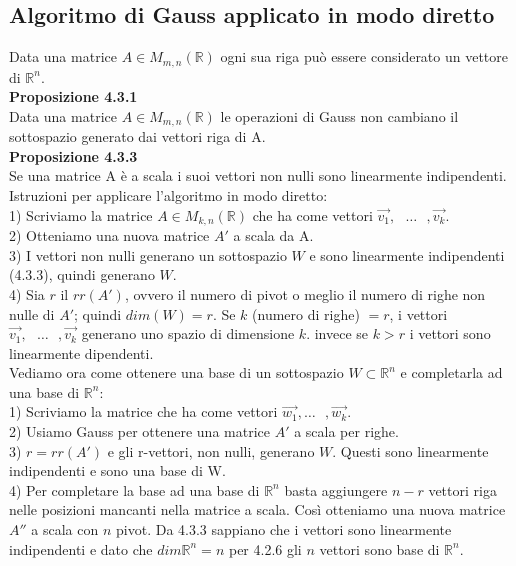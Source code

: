 \documentclass{article}
\begin{document}
\subsection{Algoritmo di Gauss applicato in modo diretto}
Data una matrice $A \in M_{m,n}(\mathbb{R})$ ogni sua riga può essere considerato un vettore di $\mathbb{R}^n$.
\textbf{\\Proposizione 4.3.1} \\Data una matrice $A \in M_{m,n}(\mathbb{R})$ le operazioni di Gauss non cambiano il sottospazio generato dai vettori riga di A.
\textbf{\\Proposizione 4.3.3} \\Se una matrice A è a scala i suoi vettori non nulli sono linearmente indipendenti.
\vspace{1em}
\\Istruzioni per applicare l'algoritmo in modo diretto:
\\1) Scriviamo la matrice $A \in M_{k,n}(\mathbb{R})$ che ha come vettori $\vec{v_1},\text{ }\dots\text{ },\vec{v_k}$.
\\2) Otteniamo una nuova matrice $A'$ a scala da A.
\\3) I vettori non nulli generano un sottospazio $W$ e sono linearmente indipendenti (4.3.3), quindi generano $W$.
\\4) Sia $r$ il $rr(A')$, ovvero il numero di pivot o meglio il numero di righe non nulle di $A'$; quindi $dim(W)=r$. Se $k$ (numero di righe) $=r$, i vettori $\vec{v_1},\text{ }\dots\text{ },\vec{v_k}$ generano uno spazio di dimensione $k$. invece se $k>r$ i vettori sono linearmente dipendenti.
\vspace{15px}
\\Vediamo ora come ottenere una base di un sottospazio $W \subset \mathbb{R}^n$ e completarla ad una base di $\mathbb{R}^n$:
\\1) Scriviamo la matrice che ha come vettori $\vec{w_1},\text{}\dots\text{ },\vec{w_k}$.
\\2) Usiamo Gauss per ottenere una matrice $A'$ a scala per righe.
\\3) $r=rr(A')$ e gli r-vettori, non nulli, generano $W$. Questi sono linearmente indipendenti e sono una base di W.
\\4) Per completare la base ad una base di $\mathbb{R}^n$ basta aggiungere $n-r$ vettori riga nelle posizioni mancanti nella matrice a scala. Così otteniamo una nuova matrice $A''$ a scala con $n$ pivot. Da 4.3.3 sappiano che i vettori sono linearmente indipendenti e dato che $dim{\mathbb{R}^n}=n$ per 4.2.6 gli $n$ vettori sono base di $\mathbb{R}^n$.
\end{document}
